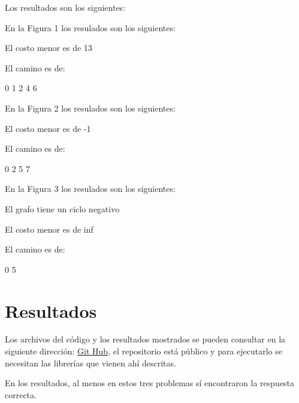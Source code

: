 \documentclass{report}
\begin{document}
\newpage
Los resultados son los siguientes: 

\begin{minipage}[b]{0.3\linewidth}

En la Figura 1 los resulados  son los siguientes:

El costo menor es de 13

El camino es de: 

0 1 2 4 6 
  \end{minipage}
  \hspace{0.5cm}
\begin{minipage}[b]{0.3\linewidth}
En la Figura 2 los resulados  son los siguientes:


  El costo menor es de -1

El camino es de: 

0 2 5 7 
\end{minipage}
\hspace{0.5cm}
\begin{minipage}[b]{0.3\linewidth}
En la Figura 3 los  resulados  son los siguientes:

  El grafo tiene un ciclo  negativo 

El costo menor es de inf 

El camino es de: 

0 5 
  \end{minipage}

\section*{Resultados}

Los archivos del código y los resultados mostrados se pueden consultar en la siguiente dirección: \href{https://github.com/arnoldae9/redes.git}{Git Hub}, el repositorio está público y para ejecutarlo se necesitan las librerías que vienen ahí descritas.

En los resultados, al menos en estos tres problemas sí encontraron la respuesta correcta.
\end{document}
